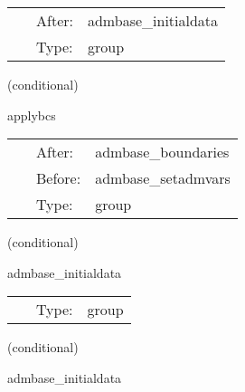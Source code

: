 \hspace{5mm}

 \begin{tabular*}{160mm}{cll} 
~ & After:  & admbase\_initialdata \\ 
~ & Type:  & group \\ 
\end{tabular*} 


\vspace{5mm}

   (conditional) 

\hspace{5mm} applybcs 

\hspace{5mm}{\it apply the boundary conditions of admbase } 


\hspace{5mm}

 \begin{tabular*}{160mm}{cll} 
~ & After:  & admbase\_boundaries \\ 
~ & Before:  & admbase\_setadmvars \\ 
~ & Type:  & group \\ 
\end{tabular*} 


\vspace{5mm}

   (conditional) 

\hspace{5mm} admbase\_initialdata 

\hspace{5mm}{\it schedule group for calculating adm initial data } 


\hspace{5mm}

 \begin{tabular*}{160mm}{cll} 
~ & Type:  & group \\ 
\end{tabular*} 


\vspace{5mm}

   (conditional) 

\hspace{5mm} admbase\_initialdata 

\hspace{5mm}{\it schedule group for calculating adm initial data } 


\hspace{5mm}

